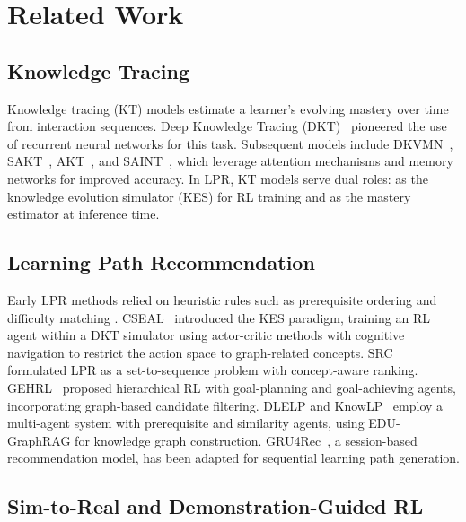 \documentclass[sigconf,anonymous]{acmart}
\begin{document}
\section{Related Work}

\subsection{Knowledge Tracing}

Knowledge tracing (KT) models estimate a learner's evolving mastery over time from interaction sequences. Deep Knowledge Tracing (DKT)~\cite{piech2015dkt} pioneered the use of recurrent neural networks for this task. Subsequent models include DKVMN~\cite{zhang2017dkvmn}, SAKT~\cite{pandey2019sakt}, AKT~\cite{ghosh2020akt}, and SAINT~\cite{choi2020saint}, which leverage attention mechanisms and memory networks for improved accuracy. In LPR, KT models serve dual roles: as the knowledge evolution simulator (KES) for RL training and as the mastery estimator at inference time.

\subsection{Learning Path Recommendation}

Early LPR methods relied on heuristic rules such as prerequisite ordering \cite{chen2018prerequisite} and difficulty matching \cite{liu2019cseal}. CSEAL~\cite{liu2019cseal} introduced the KES paradigm, training an RL agent within a DKT simulator using actor-critic methods with cognitive navigation to restrict the action space to graph-related concepts. SRC~\cite{chen2023src} formulated LPR as a set-to-sequence problem with concept-aware ranking. GEHRL~\cite{li2023gehrl} proposed hierarchical RL with goal-planning and goal-achieving agents, incorporating graph-based candidate filtering. DLELP and KnowLP~\cite{cheng2025knowlp} employ a multi-agent system with prerequisite and similarity agents, using EDU-GraphRAG for knowledge graph construction. GRU4Rec~\cite{hidasi2016gru4rec}, a session-based recommendation model, has been adapted for sequential learning path generation.

\subsection{Sim-to-Real and Demonstration-Guided RL}
\end{document}
